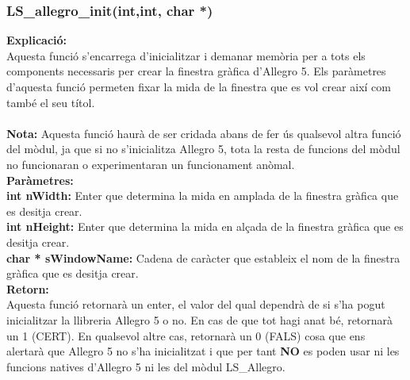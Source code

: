 \documentclass[11pt]{article}
\begin{document}
\subsubsection{LS\_allegro\_init(int,int, char *)}
\textbf{Explicació:}\\
Aquesta funció s'encarrega d'inicialitzar i demanar memòria per a tots els components necessaris per crear la finestra gràfica d'Allegro 5. Els paràmetres d'aquesta funció permeten fixar la mida de la finestra que es vol crear així com també el seu títol.\\\\
\textbf{Nota:} Aquesta funció haurà de ser cridada abans de fer ús qualsevol altra funció del mòdul, ja que si no s'inicialitza Allegro 5, tota la resta de funcions del mòdul no funcionaran o experimentaran un funcionament anòmal.\\

\noindent \textbf{Paràmetres:}\\
\textbf{int nWidth:} Enter que determina la mida en amplada de la finestra gràfica que es desitja crear.\\
\textbf{int nHeight:} Enter que determina la mida en alçada de la finestra gràfica que es desitja crear.\\
\textbf{char * sWindowName: } Cadena de caràcter que estableix el nom de la finestra gràfica que es desitja crear.\\

\noindent \textbf{Retorn:}\\
Aquesta funció retornarà un enter, el valor del qual dependrà de si s'ha pogut inicialitzar la llibreria Allegro 5 o no. En cas de que tot hagi anat bé, retornarà un 1 (CERT). En qualsevol altre cas, retornarà un 0 (FALS) cosa que ens alertarà que Allegro 5 no s'ha inicialitzat i que per tant \textbf{NO} es poden usar ni les funcions natives d'Allegro 5 ni les del mòdul LS\_Allegro.

\pagebreak
\end{document}
